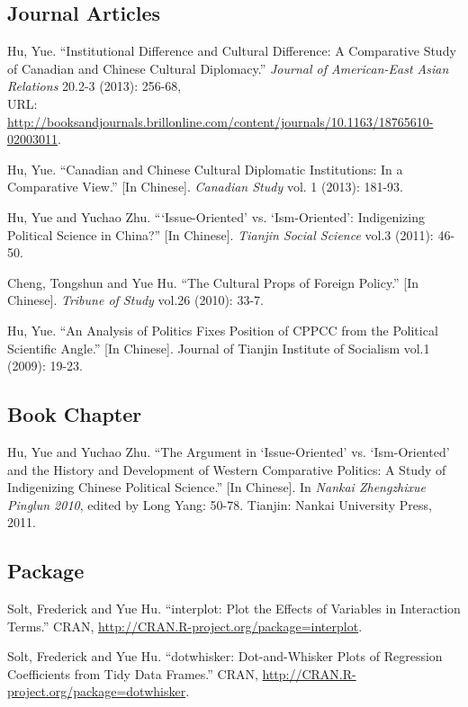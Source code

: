\documentclass[letterpaper]{article}
\renewenvironment{itemize}{
  \begin{list}{}{
    \setlength{\leftmargin}{1.5em}
  }
}{
  \end{list}
}
\begin{document}
\subsection*{Journal Articles}
\begin{itemize}
\item Hu, Yue. ``Institutional Difference and Cultural Difference: A Comparative Study of Canadian and Chinese Cultural Diplomacy.'' \textit{Journal of American-East Asian Relations} 20.2-3 (2013): 256-68,\\ URL: \url{http://booksandjournals.brillonline.com/content/journals/10.1163/18765610-02003011}.
\item Hu, Yue. ``Canadian and Chinese Cultural Diplomatic Institutions: In a Comparative View.'' [In Chinese]. \textit{Canadian Study} vol. 1 (2013): 181-93.
\item Hu, Yue and Yuchao Zhu. ```Issue-Oriented' vs. `Ism-Oriented': Indigenizing Political Science in China?'' [In Chinese]. \textit{Tianjin Social Science} vol.3 (2011): 46-50.
\item Cheng, Tongshun and Yue Hu. ``The Cultural Props of Foreign Policy.'' [In Chinese]. \textit{Tribune of Study} vol.26 (2010): 33-7.
\item Hu, Yue. ``An Analysis of Politics Fixes Position of CPPCC from the Political Scientific Angle.'' [In Chinese]. Journal of Tianjin Institute of Socialism vol.1 (2009): 19-23.
\end{itemize}

\subsection*{Book Chapter}
\begin{itemize}
\item Hu, Yue and Yuchao Zhu. ``The Argument in `Issue-Oriented' vs. `Ism-Oriented' and the History and Development of Western Comparative Politics: A Study of Indigenizing Chinese Political Science.'' [In Chinese]. In \textit{Nankai Zhengzhixue Pinglun 2010}, edited by Long Yang: 50-78. Tianjin: Nankai University Press, 2011.
\end{itemize}

\subsection*{Package}
\begin{itemize}
	\item Solt, Frederick and Yue Hu. ``interplot: Plot the Effects of Variables in Interaction Terms.'' CRAN, \url{http://CRAN.R-project.org/package=interplot}.
	\item Solt, Frederick and Yue Hu. ``dotwhisker: Dot-and-Whisker Plots of Regression Coefficients from Tidy Data Frames.'' CRAN, \url{http://CRAN.R-project.org/package=dotwhisker}.
\end{itemize}
\end{document}
